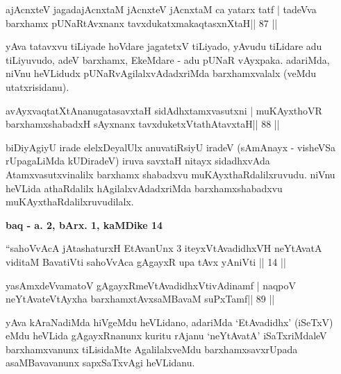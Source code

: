
\begin{shl}
ajAcnxteV jagadajAcnxtaM jAcnxteV jAcnxtaM ca yatarx tatf |
tadeVva barxhamx pUNaRtAvxnanx tavxdukatxmakaqtasxnXtaH\hfill || 87 ||
\end{shl}

\begin{artha}
yAva tatavxvu tiLiyade hoVdare jagatetxV tiLiyado, yAvudu tiLidare adu  tiLiyuvudo, adeV barxhamx, EkeMdare - adu pUNaR vAyxpaka. adariMda, niVnu heVLidudx pUNaRvAgilalxvAdadxriMda barxhamxvalalx (veMdu utatxrisidanu).
\end{artha}

\begin{shl}
avAyxvaqtatXtAnanugatasavxtaH sidAdhxtamxvasutxni |
muKAyxthoVR barxhamxshabadxH sAyxnanx tavxduketxV\s tathAtavxtaH\hfill || 88 ||
\end{shl}

\begin{artha}
biDiyAgiyU irade elelxDeyalUlx anuvatiRsiyU iradeV (sAmAnayx - visheVSa rUpagaLiMda kUDiradeV) iruva savxtaH nitayx sidadhxvAda Atamxvasutxvinalilx barxhamx shabadxvu muKAyxthaRdalilxruvudu. niVnu heVLida athaRdalilx hAgilalxvAdadxriMda barxhamxshabadxvu muKAyxthaRdalilxruvudilalx.
\end{artha} 

\newpage

\begin{center}
{\large\textbf{baq - a. 2, bArx. 1, kaMDike 14}}
\end{center}

\begin{shl}
``sahoVvAcA jAtashaturxH EtAvanUnx 3 iteyxVtAvadidhxVH
neYtAvatA viditaM BavatiVti sahoVvAca gAgayxR
upa tAvx yAniVti || 14 ||
\end{shl}

\begin{shl}
yasAmxdeVvamatoV gAgayxRmeVtAvadidhxVtivAdinamf |
naqpoV neYtAvateVtAyxha barxhamxtAvxsaMBavaM suPxTamf\hfill || 89 ||
\end{shl}

\begin{artha}
yAva kAraNadiMda hiVgeMdu heVLidano, adariMda `EtAvadidhx' (iSeTxV) eMdu heVLida gAgayxRnanunx kuritu rAjanu `neYtAvatA' iSaTxriMdaleV barxhamxvanunx tiLisidaMte AgalilalxveMdu barxhamxsavxrUpada asaMBavavanunx sapxSaTxvAgi heVLidanu.
\end{artha}

